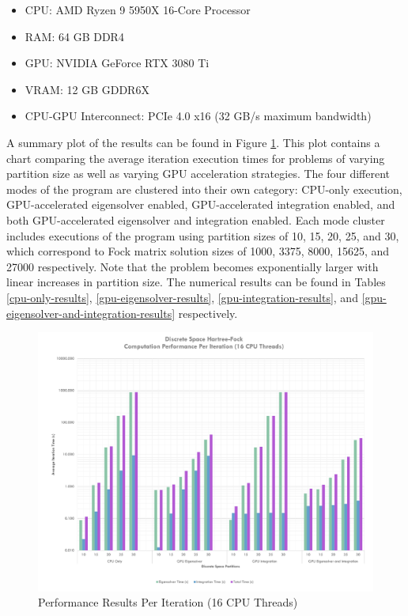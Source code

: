 \documentclass[conference, twoside]{IEEEtran}
\begin{document}
\begin{itemize}
    \item CPU: AMD Ryzen 9 5950X 16-Core Processor
    \item RAM: 64 GB DDR4
    \item GPU: NVIDIA GeForce RTX 3080 Ti
    \item VRAM: 12 GB GDDR6X 
    \item CPU-GPU Interconnect: PCIe 4.0 x16 (32 GB/s maximum bandwidth)
\end{itemize}

A summary plot of the results can be found in Figure \ref{perf-results-per-iteration-sixteen-core}. This plot contains a chart comparing the average iteration execution times for problems of varying partition size as well as varying GPU acceleration strategies. The four different modes of the program are clustered into their own category: CPU-only execution, GPU-accelerated eigensolver enabled, GPU-accelerated integration enabled, and both GPU-accelerated eigensolver and integration enabled. Each mode cluster includes executions of the program using partition sizes of 10, 15, 20, 25, and 30, which correspond to Fock matrix solution sizes of 1000, 3375, 8000, 15625, and 27000 respectively. Note that the problem becomes exponentially larger with linear increases in partition size. The numerical results can be found in Tables \ref{cpu-only-results}, \ref{gpu-eigensolver-results}, \ref{gpu-integration-results}, and \ref{gpu-eigensolver-and-integration-results} respectively.

\begin{figure}[ht]
\centering
\includegraphics[width=7in]{figures/sixteen-core-results.pdf}
\caption{Performance Results Per Iteration (16 CPU Threads)}
\label{perf-results-per-iteration-sixteen-core}
\end{figure}
\end{document}
